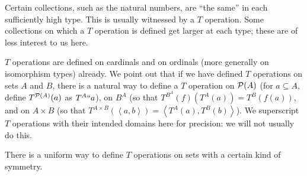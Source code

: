 \documentclass[12pt]{book}
\begin{document}
Certain collections, such as the natural numbers, are ``the same'' in
each sufficiently high type.  This is usually witnessed by a $T$
operation.  Some collections on which a $T$ operation is defined get
larger at each type; these are of less interest to us here.

$T$ operations are defined on cardinals and on ordinals (more
generally on isomorphism types) already.  We point out that if we have
defined $T$ operations on sets $A$ and $B$, there is a natural way to
define a $T$ operation on ${\cal P}(A)$ (for $a \subseteq A$, define
$T^{{\cal P}(A)}(a)$ as $T^A``a$), on $B^A$ (so that
$T^{B^A}(f)(T^A(a)) = T^B(f(a))$, and on $A\times B$ (so that $T^{A
\times B}(\left<a,b\right>) = \left<T^A(a),T^B(b)\right>$).  We
superscript $T$ operations with their intended domains here for
precision:  we will not usually do this.

There is a uniform way to define $T$ operations on sets with a certain
kind of symmetry.  
\end{document}

